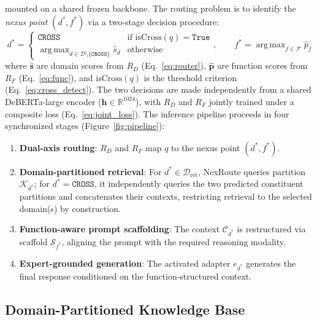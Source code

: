 \documentclass[a4paper,fleql,doubleblind]{cas-sc}
\DeclareMathOperator*{\argmax}{arg\,max}
\begin{document}
mounted on a shared frozen backbone. The routing problem is to identify the
\textit{nexus point} $(d^*, f^*)$ via a two-stage decision procedure:
\begin{equation}
    d^* = \begin{cases}
        \texttt{CROSS} & \text{if } \mathrm{isCross}(q) = \texttt{True} \\
        \displaystyle\argmax_{d \in \mathcal{D} \setminus \{\texttt{CROSS}\}} \hat{s}_d & \text{otherwise}
    \end{cases},
    \qquad
    f^* = \argmax_{f \in \mathcal{F}} \hat{p}_f
    \label{eq:nexus_joint}
\end{equation}
where $\hat{\mathbf{s}}$ are domain scores from $R_D$ (Eq.~\ref{eq:router}), $\hat{\mathbf{p}}$ are function scores from $R_F$ (Eq.~\ref{eq:func}), and $\mathrm{isCross}(q)$ is the threshold criterion (Eq.~\ref{eq:cross_detect}). The two decisions are made independently from a shared DeBERTa-large encoder ($\mathbf{h} \in \mathbb{R}^{1024}$), with $R_D$ and $R_F$ jointly trained under a composite loss (Eq.~\ref{eq:joint_loss}).
The inference pipeline proceeds in four synchronized stages
(Figure~\ref{fig:pipeline}):
\begin{enumerate}
    \item \textbf{Dual-axis routing}: $R_D$ and $R_F$ map $q$ to the nexus
    point $(d^*, f^*)$.
    \item \textbf{Domain-partitioned retrieval}: For $d^* \in \mathcal{D}_{\text{ret}}$,
    NexRoute queries partition $\mathcal{K}_{d^*}$; for $d^*{=}\texttt{CROSS}$, it
    independently queries the two predicted constituent partitions and concatenates their
    contexts, restricting retrieval to the selected domain(s) by construction.
    \item \textbf{Function-aware prompt scaffolding}: The context
    $\mathcal{C}_{d^*}$ is restructured via scaffold $\mathcal{S}_{f^*}$,
    aligning the prompt with the required reasoning modality.
    \item \textbf{Expert-grounded generation}: The activated adapter $e_{d^*}$
    generates the final response conditioned on the function-structured context.
\end{enumerate}
\subsection{Domain-Partitioned Knowledge Base}
\label{ssec:retrieval}
\end{document}

